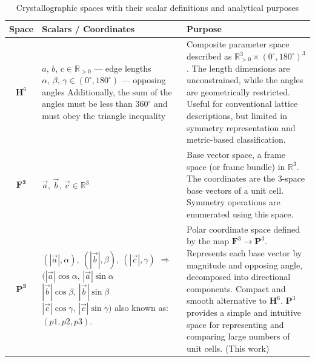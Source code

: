 \documentclass[preprint]{iucr}              %
\numberwithin{equation}{section}
\newcommand{\HVI}{\ensuremath{\mathbf{H}^{6}}}
\newcommand{\PIII}{\ensuremath{\mathbf{P}^{3}}}
\newcommand{\FIII}{\ensuremath{\mathbf{F}^{3}}}
\newcommand{\RIII}{\ensuremath{\mathbb{R}^{3}}}
\begin{document}
\begin{table}
	\label{tbl_spaces}
	\centering
	\caption{Crystallographic spaces with their scalar definitions and analytical purposes}
	\renewcommand{\arraystretch}{1.3}
	\begin{tabular}{|c|l|p{7cm}|}
		\hline
		\textbf{Space} & \textbf{Scalars / Coordinates} & \textbf{Purpose} \\

\hline
$\HVI$ &
\parbox[t]{5.5cm}{
	$a,\, b,\, c \in \mathbb{R}_{>0}$ — edge lengths\\
	$\alpha,\, \beta,\, \gamma \in (0^\circ, 180^\circ)$ — opposing angles\\
	Additionally, the sum of the angles must be less than 
	$360^\circ$ and must obey the triangle inequality
} &
Composite parameter space described as 
$\mathbb{R}_{>0}^3 \times (0^\circ, 180^\circ)^3$. 
The length dimensions are unconstrained, while the angles are 
geometrically restricted. Useful for conventional lattice 
descriptions, but limited in symmetry representation and 
metric-based classification. \\

\hline		
$\mathbf{F^3}$ &
$\vec{a},\, \vec{b},\, \vec{c} \in \mathbb{R}^3$ &
Base vector space, a frame space (or frame bundle) in \RIII. The coordinates are the 3-space 
base vectors of a unit cell. Symmetry 
operations are enumerated using this space. \\
\hline

		
		$\mathbf{P^3}$ &
		\parbox[t]{5.5cm}{
			$(|\vec{a}|,\alpha),\ (|\vec{b}|,\beta),\ (|\vec{c}|,\gamma)$\\
			$\Rightarrow$\,\\ 
			\hspace*{0.5cm}$(|\vec{a}|\cos\alpha,\, |\vec{a}|\sin\alpha$\\
		\hspace*{0.5cm}	$|\vec{b}|\cos\beta,\, |\vec{b}|\sin\beta$\\
		\hspace*{0.5cm}	$|\vec{c}|\cos\gamma,\, |\vec{c}|\sin\gamma)$ \\
		also known as: \\
		\hspace*{0.5cm}	\ensuremath{(p1,p2,p3)}. 
		} &
		Polar coordinate space defined by the map $\FIII \rightarrow \PIII$. Represents each base vector by magnitude and opposing angle, decomposed into directional components. Compact and smooth alternative to $\HVI$. \PIII{} provides a simple
		and intuitive space for representing and comparing
		 large numbers of unit cells. (This work) \\
		\hline



\end{tabular}
\end{table}
\end{document}
